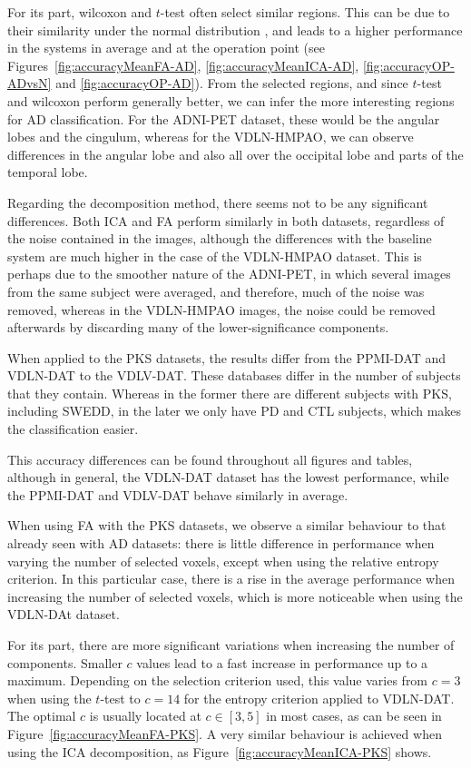 For its part, wilcoxon and $t$-test often select similar regions. This can be due to their similarity under the normal distribution \cite{Fay10}, and leads to a higher performance in the systems in average and at the operation point (see Figures~\ref{fig:accuracyMeanFA-AD}, \ref{fig:accuracyMeanICA-AD}, \ref{fig:accuracyOP-ADvsN} and \ref{fig:accuracyOP-AD}). From the selected regions, and since $t$-test and wilcoxon perform generally better, we can infer the more interesting regions for \ac{AD} classification. For the ADNI-PET dataset, these would be the angular lobes and the cingulum, whereas for the VDLN-HMPAO, we can observe differences in the angular lobe and also all over the occipital lobe and parts of the temporal lobe. 

Regarding the decomposition method, there seems not to be any significant differences. Both \ac{ICA} and \ac{FA} perform similarly in both datasets, regardless of the noise contained in the images, although the differences with the baseline system are much higher in the case of the VDLN-HMPAO dataset. This is perhaps due to the smoother nature of the ADNI-PET, in which several images from the same subject were averaged, and therefore, much of the noise was removed, whereas in the VDLN-HMPAO images, the noise could be removed afterwards by discarding many of the lower-significance components. 

When applied to the \ac{PKS} datasets, the results differ from the PPMI-DAT and VDLN-DAT to the VDLV-DAT. These databases differ in the number of subjects that they contain. Whereas in the former there are different subjects with \ac{PKS}, including \ac{SWEDD}, in the later we only have \ac{PD} and \ac{CTL} subjects, which makes the classification easier. 

This accuracy differences can be found throughout all figures and tables, although in general, the VDLN-DAT dataset has the lowest performance, while the PPMI-DAT and VDLV-DAT behave similarly in average. 

When using \ac{FA} with the \ac{PKS} datasets, we observe a similar behaviour to that already seen with \ac{AD} datasets: there is little difference in performance when varying the number of selected voxels, except when using the relative entropy criterion. In this particular case, there is a rise in the average performance when increasing the number of selected voxels, which is more noticeable when using the VDLN-DAt dataset. 

For its part, there are more significant variations when increasing the number of components. Smaller $c$ values lead to a fast increase in performance up to a maximum. Depending on the selection criterion used, this value varies from $c=3$ when using the $t$-test to $c=14$ for the entropy criterion applied to VDLN-DAT. The optimal $c$ is usually located at $c\in [3,5]$ in most cases, as can be seen in Figure~\ref{fig:accuracyMeanFA-PKS}. A very similar behaviour is achieved when using the \ac{ICA} decomposition, as Figure~\ref{fig:accuracyMeanICA-PKS} shows.

